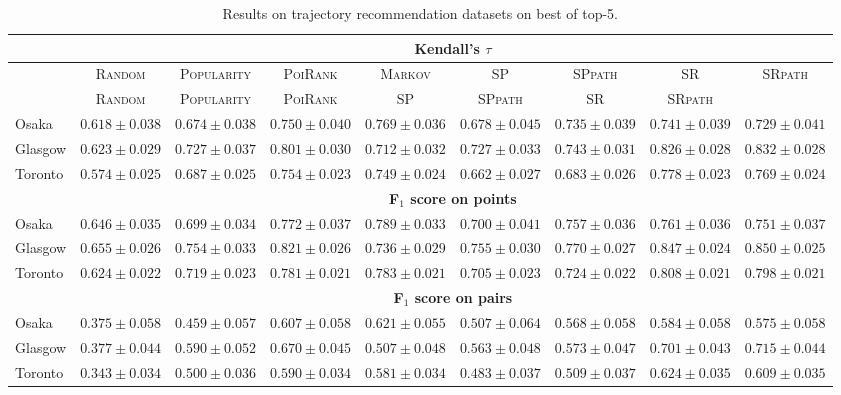 \begin{table*}[!h]
\caption{Results on trajectory recommendation datasets on best of top-5.}
\centering
\scriptsize
\setlength{\tabcolsep}{3pt} %
\begin{tabular}{l|cc|ccc|ccc} \hline
& \multicolumn{8}{c}{\bf Kendall's $\tau$} \\ \hline
 & \textsc{Random} & \textsc{Popularity} & \textsc{PoiRank} & \textsc{Markov} & \textsc{SP} & \textsc{SPpath} & \textsc{SR} & \textsc{SRpath} \\ \hline
 & \textsc{Random} & \textsc{Popularity} & \textsc{PoiRank} & \textsc{SP} & \textsc{SPpath} & \textsc{SR} & \textsc{SRpath} \\ \hline
Osaka & $0.618\pm0.038$ & $0.674\pm0.038$ & $\mathit{0.750\pm0.040}$ & $\mathbf{0.769\pm0.036}$ & $0.678\pm0.045$ & $0.735\pm0.039$ & $0.741\pm0.039$ & $0.729\pm0.041$ \\
Glasgow & $0.623\pm0.029$ & $0.727\pm0.037$ & $0.801\pm0.030$ & $0.712\pm0.032$ & $0.727\pm0.033$ & $0.743\pm0.031$ & $\mathit{0.826\pm0.028}$ & $\mathbf{0.832\pm0.028}$ \\
Toronto & $0.574\pm0.025$ & $0.687\pm0.025$ & $0.754\pm0.023$ & $0.749\pm0.024$ & $0.662\pm0.027$ & $0.683\pm0.026$ & $\mathbf{0.778\pm0.023}$ & $\mathit{0.769\pm0.024}$ \\
\hline
& \multicolumn{8}{c}{\bf F$_1$ score on points} \\ \hline
Osaka & $0.646\pm0.035$ & $0.699\pm0.034$ & $\mathit{0.772\pm0.037}$ & $\mathbf{0.789\pm0.033}$ & $0.700\pm0.041$ & $0.757\pm0.036$ & $0.761\pm0.036$ & $0.751\pm0.037$ \\
Glasgow & $0.655\pm0.026$ & $0.754\pm0.033$ & $0.821\pm0.026$ & $0.736\pm0.029$ & $0.755\pm0.030$ & $0.770\pm0.027$ & $\mathit{0.847\pm0.024}$ & $\mathbf{0.850\pm0.025}$ \\
Toronto & $0.624\pm0.022$ & $0.719\pm0.023$ & $0.781\pm0.021$ & $0.783\pm0.021$ & $0.705\pm0.023$ & $0.724\pm0.022$ & $\mathbf{0.808\pm0.021}$ & $\mathit{0.798\pm0.021}$ \\
\hline
& \multicolumn{8}{c}{\bf F$_1$ score on pairs} \\ \hline
Osaka & $0.375\pm0.058$ & $0.459\pm0.057$ & $\mathit{0.607\pm0.058}$ & $\mathbf{0.621\pm0.055}$ & $0.507\pm0.064$ & $0.568\pm0.058$ & $0.584\pm0.058$ & $0.575\pm0.058$ \\
Glasgow & $0.377\pm0.044$ & $0.590\pm0.052$ & $0.670\pm0.045$ & $0.507\pm0.048$ & $0.563\pm0.048$ & $0.573\pm0.047$ & $\mathit{0.701\pm0.043}$ & $\mathbf{0.715\pm0.044}$ \\
Toronto & $0.343\pm0.034$ & $0.500\pm0.036$ & $0.590\pm0.034$ & $0.581\pm0.034$ & $0.483\pm0.037$ & $0.509\pm0.037$ & $\mathbf{0.624\pm0.035}$ & $\mathit{0.609\pm0.035}$ \\
\hline
\end{tabular}
\end{table*}


